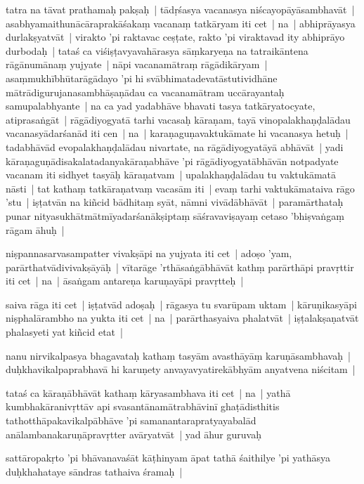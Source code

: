 \documentclass[article,a4paper]{memoir}
\begin{document}
	  \pstart tatra na tā\-vat prathamaḥ pakṣaḥ | tā\-dṛśasya vacanasya niścayopā\-yā\-sambhavā\-t | asabhyamaithunā\-cā\-raprakā\-śakaṃ vacanaṃ tatkā\-ryam iti cet | na | abhiprā\-yasya durlakṣyatvā\-t | virakto 'pi raktavac ceṣṭate, rakto 'pi viraktavad ity abhiprā\-yo durbodaḥ | tataś ca viśiṣṭavyavahā\-rasya sā\-ṃkaryeṇa na tatraikā\-ntena rā\-gā\-numā\-naṃ yujyate | nā\-pi vacanamā\-traṃ rā\-gā\-dikā\-ryam | asaṃmukhī\-bhū\-tarā\-gā\-dayo 'pi hi svā\-bhimatadevatā\-stutividhā\-ne mā\-trā\-digurujanasambhā\-ṣaṇā\-dau ca vacanamā\-tram uccā\-rayantaḥ samupalabhyante | na ca yad yadabhā\-ve bhavati tasya tatkā\-ryatocyate, atiprasaṅgā\-t | rā\-gā\-diyogyatā\- tarhi vacasaḥ kā\-raṇam, tayā\- vinopalakhaṇḍalā\-dau vacanasyā\-darśanā\-d iti cen | na | karaṇaguṇavaktukā\-mate hi vacanasya hetuḥ | tadabhā\-vā\-d evopalakhaṇḍalā\-dau nivartate, na rā\-gā\-diyogyatā\-yā\- abhā\-vā\-t | yadi kā\-raṇaguṇā\-disakalatadanyakā\-raṇabhā\-ve 'pi rā\-gā\-diyogyatā\-bhā\-vā\-n notpadyate vacanam iti sidhyet tasyā\-ḥ kā\-raṇatvam | upalakhaṇḍalā\-dau tu vaktukā\-matā\- nā\-sti | tat kathaṃ tatkā\-raṇatvaṃ vacasā\-m iti | evaṃ tarhi vaktukā\-mataiva rā\-go 'stu | iṣṭatvā\-n na kiñcid bā\-dhitaṃ syā\-t, nā\-mni vivā\-dā\-bhā\-vā\-t | paramā\-rthataḥ punar nityasukhā\-tmā\-tmī\-yadarśanā\-kṣiptaṃ sā\-śravaviṣayaṃ cetaso 'bhiṣvaṅgaṃ rā\-gam ā\-huḥ | 
	\pend
      

	  \pstart niṣpannasarvasampatter vivakṣā\-pi na yujyata iti cet | adoṣo 'yam, parā\-rthatvā\-divivakṣā\-yā\-ḥ | vī\-tarā\-ge 'rthā\-saṅgā\-bhā\-vā\-t kathṃ parā\-rthā\-pi pravṛttir iti cet | na | ā\-saṅgam antareṇa karuṇayā\-pi pravṛtteḥ | 
	\pend
      

	  \pstart saiva rā\-ga iti cet | iṣṭatvā\-d adoṣaḥ | rā\-gasya tu svarū\-pam uktam | kā\-ruṇikasyā\-pi niṣphalā\-rambho na yukta iti cet | na | parā\-rthasyaiva phalatvā\-t | iṣṭalakṣaṇatvā\-t phalasyeti yat kiñcid etat | 
	\pend
      

	  \pstart nanu nirvikalpasya bhagavataḥ kathaṃ tasyā\-m avasthā\-yā\-ṃ karuṇā\-sambhavaḥ | duḥkhavikalpaprabhavā\- hi karuṇety anvayavyatirekā\-bhyā\-m anyatvena niścitam | 
	\pend
      

	  \pstart tataś ca kā\-raṇā\-bhā\-vā\-t kathaṃ kā\-ryasambhava iti cet | na | yathā\- kumbhakā\-ranivṛttā\-v api svasantā\-namā\-trabhā\-vinī\- ghaṭā\-disthitis tathotthā\-pakavikalpā\-bhā\-ve 'pi samanantarapratyayabalā\-d anā\-lambanakaruṇā\-pravṛtter avā\-ryatvā\-t | yad ā\-hur guruvaḥ 
	\pend
      

	  \pstart sattā\-ropakṛto 'pi bhā\-vanavaśā\-t kā\-ṭhinyam ā\-pat tathā\- śaithilye 'pi yathā\-sya duḥkhahataye sā\-ndras tathaiva śramaḥ | 
	\pend
      
\end{document}
